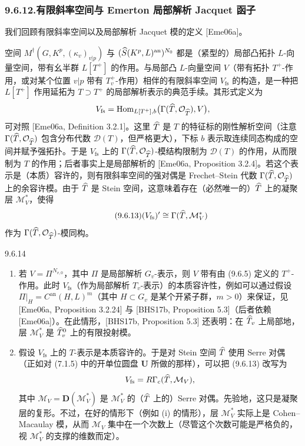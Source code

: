 \subsubsection*{9.6.12.\quad 有限斜率空间与 Emerton 局部解析 Jacquet 函子}

我们回顾有限斜率空间以及局部解析 Jacquet 模的定义 [Eme06a]。

空间 $M^\dagger(G,K^p,(\kappa_v)_{v|p})$ 与 $(\widehat S(K^p,L)^{\mathrm{an}})^{N_0}$ 都是（紧型的）局部凸拓扑 $L$-向量空间，带有幺半群 $L[T^+]$ 的作用。与局部凸 $L$-向量空间 $V$（带有拓扑 $T^+$-作用，或对某个位置 $v|p$ 带有 $T_v^+$-作用）相伴的有限斜率空间 $V_{\mathrm{fs}}$ 的构造，是一种把 $L[T^+]$ 作用延拓为 $T\supset T^+$ 的局部解析表示的典范手续。其形式定义为
\[
V_{\mathrm{fs}}=\operatorname{Hom}_{L[T^+],b}\bigl(\Gamma(\widehat T,\mathcal{O}_{\widehat T}),V\bigr),
\]
可对照 [Eme06a, Definition 3.2.1]。这里 $\widehat T$ 是 $T$ 的特征标的刚性解析空间（注意 $\Gamma(\widehat T,\mathcal{O}_{\widehat T})$ 包含分布代数 $\mathcal D(T)$，但严格更大），下标 $b$ 表示取连续同态构成的空间并赋予强拓扑。于是 $V_{\mathrm{fs}}$ 上的 $\Gamma(\widehat T,\mathcal{O}_{\widehat T})$-模结构限制为 $\mathcal D(T)$ 的作用，从而限制为 $T$ 的作用；后者事实上是局部解析的 [Eme06a, Proposition 3.2.4]。若这个表示是（本质）容许的，则有限斜率空间的强对偶是 Frechet--Stein 代数 $\Gamma(\widehat T,\mathcal{O}_{\widehat T})$ 上的余容许模。由于 $\widehat T$ 是 Stein 空间，这意味着存在（必然唯一的）$\widehat T$ 上的凝聚层 $\mathcal M^*_V$，使得
\begin{equation}\tag{9.6.13}\label{eq:a4-16-9-6-13}
(V_{\mathrm{fs}})'\cong\Gamma(\widehat T,\mathcal M^*_V)
\end{equation}
作为 $\Gamma(\widehat T,\mathcal{O}_{\widehat T})$-模同构。

\begin{rem}{9.6.14}\label{rem:a4-16-9-6-14}
\begin{enumerate}
\item[(i)] 若 $V=\Pi^{N_{v,0}}$，其中 $\Pi$ 是局部解析 $G_v$-表示，则 $V$ 带有由 (9.6.5) 定义的 $T^+$-作用。此时 $V_{\mathrm{fs}}$（作为局部解析 $T_v$-表示）的本质容许性，例如可以通过假设 $\Pi|_H=C^{\mathrm{an}}(H,L)^m$（其中 $H\subset G_v$ 是某个开紧子群，$m>0$）来保证，见 [Eme06a, Proposition 3.2.24] 与 [BHS17b, Proposition 5.3]（后者依赖 [Eme06a]）。在此情形，[BHS17b, Proposition 5.3] 还表明：在 $\widehat T_v$ 上局部地，层 $\mathcal M^*_V$ 是 $\widehat T^0_v$ 上的有限投射模。
\item[(ii)] 假设 $V_{\mathrm{fs}}$ 上的 $T$-表示是本质容许的。于是对 Stein 空间 $\widehat T$ 使用 Serre 对偶（正如对 (7.1.5) 中的开单位圆盘 $\mathbf U$ 所做的那样），可以把 (9.6.13) 改写为
\[
V_{\mathrm{fs}}=R\Gamma_c(\widehat T,\mathcal M_V),
\]
其中 $\mathcal M_V=\mathbf D(\mathcal M^*_V)$ 是 $\mathcal M^*_V$ 的（$\widehat T$ 上的）Serre 对偶。先验地，这只是凝聚层的复形。不过，在好的情形下（例如 (i) 的情形），层 $\mathcal M^*_V$ 实际上是 Cohen--Macaulay 模，从而 $\mathcal M_V$ 集中在一个次数上（尽管这个次数可能是严格负的，视 $\mathcal M^*_V$ 的支撑的维数而定）。
\end{enumerate}
\end{rem}

